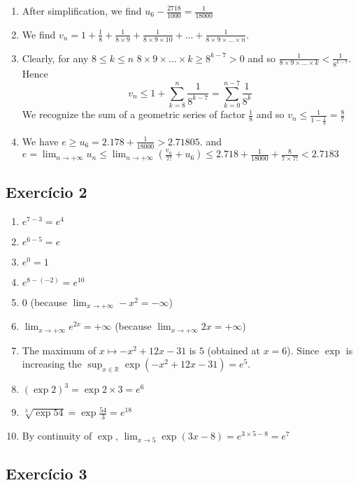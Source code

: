 \begin{enumerate}
\item After simplification, we find $u_6 - \frac{2718}{1000} = \frac{1}{18000}$
\item We find $v_n = 1 + \frac{1}{8} + \frac{1}{8 \times 9} +
  \frac{1}{8 \times 9 \times 10} + ... + \frac{1}{8 \times 9 \times \dots
    \times n}$.
\item Clearly, for any $8 \leq k \leq n$
  $8 \times 9 \times \dots \times k \geq 8^{k - 7} > 0$ and so
  $\frac{1}{8 \times 9 \times \dots \times k} < \frac{1}{8^{k-7}}$.
  Hence
  $$v_n \leq 1 + \sum_{k = 8}^{n} \frac{1}{8^{k-7}} =
  \sum_{k = 0}^{n-7} \frac{1}{8^k}$$
  We recognize the sum of a geometric series of factor $\frac{1}{8}$ and so
  $v_n \leq \frac{1}{1 - \frac{1}{8}} = \frac{8}{7}$
\item We have $e \geq u_6 = 2.178 + \frac{1}{18000} > 2.71805$.
  and $e = \lim_{n\rightarrow +\infty} u_n \leq
  \lim_{n\rightarrow +\infty} {(\frac{v_n}{7!} + u_6)} \leq
  2.718 + \frac{1}{18000} + \frac{8}{7 \times 7!} <
  2.7183$
\end{enumerate}

\subsection*{Exercício 2}

\begin{enumerate}
\item $e^{7-3} = e^4$
\item $e^{6-5} = e$
\item $e^0 = 1$
\item $e^{8-{(-2)}} = e^{10}$
\item $0$ (because $\lim_{x \rightarrow +\infty} -x^2 = -\infty$)
\item $\lim_{x \rightarrow +\infty} e^{2x} = +\infty$ (because
  $\lim_{x \rightarrow +\infty} 2x = +\infty$)
\item The maximum of $x \mapsto -x^2+12x-31$ is $5$ (obtained at $x=6$).
  Since $\exp$ is increasing the
  $\sup_{x \in \mathbb R} \exp{(-x^2+12x-31)} = e^5$.
\item ${(\exp{2})}^3 = \exp{2 \times 3} = e^6$
\item $\sqrt[3]{\exp{54}} = \exp{\frac{54}{3}} = e^{18}$
\item By continuity of $\exp$,
  $\lim_{x \rightarrow 5} \exp{(3x - 8)} = e^{3 \times 5 - 8} = e^7$
\end{enumerate}

\subsection*{Exercício 3}

